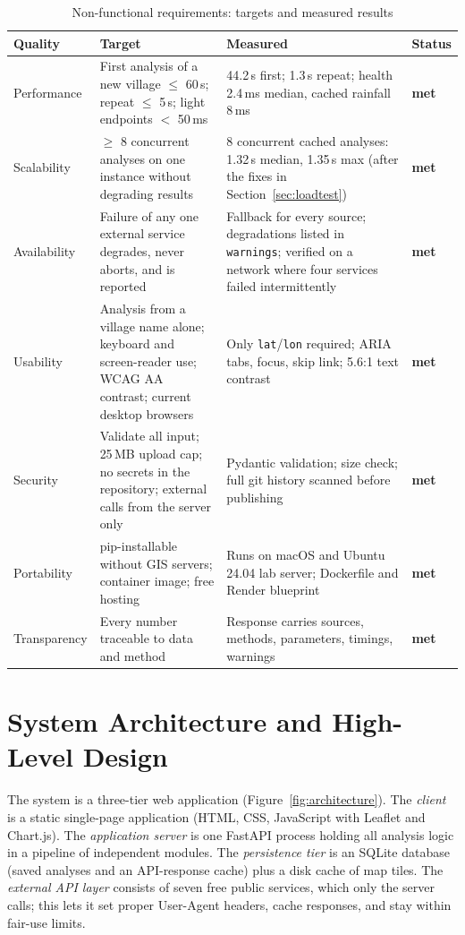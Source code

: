 \documentclass[manuscript,screen,review]{acmart}
\newcommand{\code}[1]{\texttt{\small #1}}
\newcommand{\ok}{\textcolor{good}{\textbf{met}}}
\begin{document}
\begin{table}[h]
  \caption{Non-functional requirements: targets and measured results}
  \label{tab:nfr}
  \small
  \begin{tabularx}{\linewidth}{@{}P{2.3cm}YYP{1.1cm}@{}}
    \toprule
    Quality & Target & Measured & Status \\
    \midrule
    Performance & First analysis of a new village $\le$ 60\,s; repeat $\le$ 5\,s; light endpoints $<$ 50\,ms & 44.2\,s first; 1.3\,s repeat; health 2.4\,ms median, cached rainfall 8\,ms & \ok \\
    Scalability & $\ge$ 8 concurrent analyses on one instance without degrading results & 8 concurrent cached analyses: 1.32\,s median, 1.35\,s max (after the fixes in Section~\ref{sec:loadtest}) & \ok \\
    Availability & Failure of any one external service degrades, never aborts, and is reported & Fallback for every source; degradations listed in \code{warnings}; verified on a network where four services failed intermittently & \ok \\
    Usability & Analysis from a village name alone; keyboard and screen-reader use; WCAG AA contrast; current desktop browsers & Only \code{lat}/\code{lon} required; ARIA tabs, focus, skip link; 5.6:1 text contrast & \ok \\
    Security & Validate all input; 25\,MB upload cap; no secrets in the repository; external calls from the server only & Pydantic validation; size check; full git history scanned before publishing & \ok \\
    Portability & pip-installable without GIS servers; container image; free hosting & Runs on macOS and Ubuntu 24.04 lab server; Dockerfile and Render blueprint & \ok \\
    Transparency & Every number traceable to data and method & Response carries sources, methods, parameters, timings, warnings & \ok \\
    \bottomrule
  \end{tabularx}
\end{table}

\section{System Architecture and High-Level Design}
\label{sec:architecture}
The system is a three-tier web application (Figure~\ref{fig:architecture}). The
\emph{client} is a static single-page application (HTML, CSS, JavaScript with Leaflet and
Chart.js). The \emph{application server} is one FastAPI process holding all analysis logic in
a pipeline of independent modules. The \emph{persistence tier} is an SQLite database (saved
analyses and an API-response cache) plus a disk cache of map tiles. The \emph{external API
layer} consists of seven free public services, which only the server calls; this lets it set
proper User-Agent headers, cache responses, and stay within fair-use limits.
\end{document}
